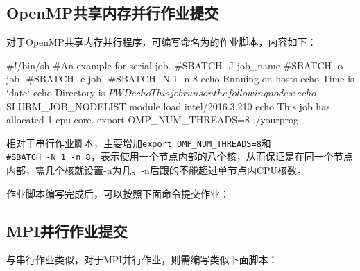 


\subsection{OpenMP共享内存并行作业提交}
对于OpenMP共享内存并行程序，可编写命名为的作业脚本，内容如下：
\begin{SH}
#!/bin/sh
#An example for serial job.
#SBATCH -J job_name
#SBATCH -o job-%
#SBATCH -e job-%
#SBATCH -N 1 -n 8
echo Running on hosts 
echo Time is `date`
echo Directory is $PWD
echo This job runs on the following nodes:
echo $SLURM_JOB_NODELIST
module load intel/2016.3.210
echo This job has allocated 1 cpu core.
export OMP_NUM_THREADS=8
./yourprog
\end{SH}

相对于串行作业脚本，主要增加\lstinline{export OMP_NUM_THREADS=8}和\\\lstinline{#SBATCH -N 1 -n 8}，表示使用一个节点内部的八个核，从而保证是在同一个节点内部，需几个核就设置-n为几。-n后跟的不能超过单节点内CPU核数。

作业脚本编写完成后，可以按照下面命令提交作业：


\subsection{MPI并行作业提交}

与串行作业类似，对于MPI并行作业，则需编写类似下面脚本：

